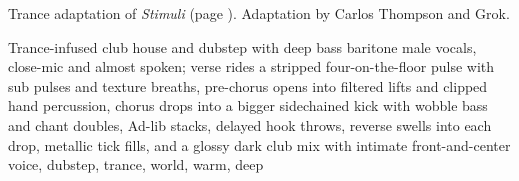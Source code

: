 
\begin{notes}
Trance adaptation of \emph{Stimuli} (page \pageref{sec:stimuli}). Adaptation by Carlos Thompson and Grok.
\end{notes}
\begin{style}
Trance-infused club house and dubstep with deep bass baritone male vocals, close-mic and almost spoken; verse rides a stripped four-on-the-floor pulse with sub pulses and texture breaths, pre-chorus opens into filtered lifts and clipped hand percussion, chorus drops into a bigger sidechained kick with wobble bass and chant doubles, Ad-lib stacks, delayed hook throws, reverse swells into each drop, metallic tick fills, and a glossy dark club mix with intimate front-and-center voice, dubstep, trance, world, warm, deep
\end{style}
